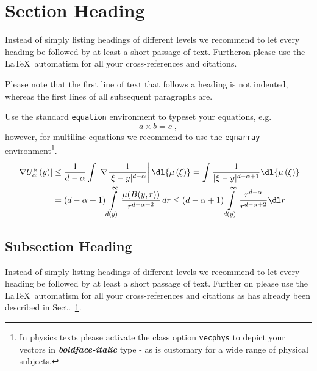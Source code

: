\section{Section Heading}
\label{sec:2}
Instead of simply listing headings of different levels we recommend to let every heading be followed by at least a short passage of text. Furtheron please use the \LaTeX\ automatism for all your cross-references and citations.

Please note that the first line of text that follows a heading is not indented, whereas the first lines of all subsequent paragraphs are.

\eject

Use the standard \verb|equation| environment to typeset your equations, e.g.
%
\begin{equation}
    a \times b = c\;,
\end{equation}
%
however, for multiline equations we recommend to use the \verb|eqnarray|
environment\footnote{In physics texts please activate the class option \texttt{vecphys} to depict your vectors in \textbf{\itshape boldface-italic} type - as is customary for a wide range of physical subjects.}.
\begin{align*}
    \left|
    \nabla
    U_{\alpha}^{\mu}
    \left(y\right)
    \right| & \le
    \frac{1}{d-\alpha}
    \int
    \left|
    \nabla
    \frac{1}{|\xi-y|^{d-\alpha}}
    \right|
    \dl{\mu\left(\xi\right)} =
    \int
    \frac{1}{|\xi-y|^{d-\alpha+1}}
    \dl{\mu\left(\xi\right)} \\
            & =
    \left(d-\alpha+1\right)
    \int\limits_{d(y)}^{\infty}
    \frac{\mu(B(y,r))}{r^{d-\alpha+2}}\,dr \le
    \left(d-\alpha+1\right)
    \int\limits_{d(y)}^{\infty}
    \frac{r^{d-\alpha}}{r^{d-\alpha+2}}\dl r
    \label{eq:01}
\end{align*}

\enlargethispage{24pt}

\subsection{Subsection Heading}
\label{subsec:2}
Instead of simply listing headings of different levels we recommend to let every heading be followed by at least a short passage of text. Further on please use the \LaTeX\ automatism for all your cross-references and citations as has already been described in Sect.~\ref{sec:2}.

